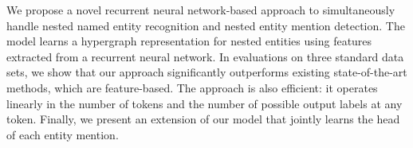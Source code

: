 We propose a novel recurrent neural network-based approach to simultaneously handle nested named entity recognition and nested entity mention detection. The model learns a hypergraph representation for nested entities using features extracted from a recurrent neural network. In evaluations on three standard data sets, we show that our approach significantly outperforms existing state-of-the-art methods, which are feature-based. The approach is also efficient: it operates linearly in the number of tokens and the number of possible output labels at any token. Finally, we present an extension of our model that jointly learns the head of each entity mention.
